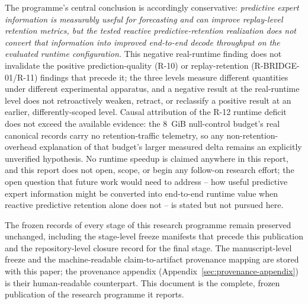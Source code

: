 The programme's central conclusion is accordingly conservative:
\emph{predictive expert information is measurably useful for forecasting
and can improve replay-level retention metrics, but the tested reactive
predictive-retention realization does not convert that information into
improved end-to-end decode throughput on the evaluated runtime
configuration.} This negative real-runtime finding does not invalidate the
positive prediction-quality (R-10) or replay-retention (R-BRIDGE-01/R-11)
findings that precede it; the three levels measure different quantities
under different experimental apparatus, and a negative result at the
real-runtime level does not retroactively weaken, retract, or reclassify a
positive result at an earlier, differently-scoped level. Causal attribution
of the R-12 runtime deficit does not exceed the available evidence: the
8~GiB null-control budget's real canonical records carry no
retention-traffic telemetry, so any non-retention-overhead explanation of
that budget's larger measured delta remains an explicitly unverified
hypothesis. No runtime speedup is claimed anywhere in this report, and this
report does not open, scope, or begin any follow-on research effort; the
open question that future work would need to address -- how useful
predictive expert information might be converted into end-to-end runtime
value when reactive predictive retention alone does not -- is stated but
not pursued here.

The frozen records of every stage of this research programme remain
preserved unchanged, including the stage-level freeze manifests that
precede this publication and the repository-level closure record for the
final stage. The manuscript-level freeze and the machine-readable
claim-to-artifact provenance mapping are stored with this paper; the
provenance appendix (Appendix~\ref{sec:provenance-appendix}) is their
human-readable counterpart. This document is the complete, frozen
publication of the research programme it reports.
